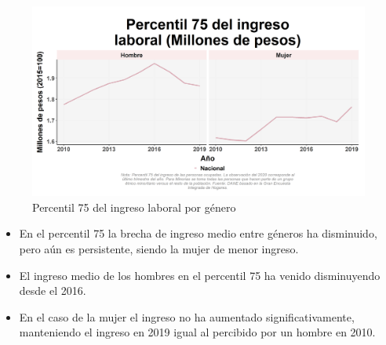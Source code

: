     \begin{figure}[H]
        \caption{Percentil 75 del ingreso laboral por género \label{map_result_2} }
        \begin{center}
        \includegraphics[width=\textwidth,keepaspectratio]{img/var_26_trend.png}
        \end{center}
    \end{figure}
            \begin{itemize}
                    \item En el percentil 75 la brecha de ingreso medio entre géneros ha disminuido, pero aún es persistente, siendo la mujer de menor ingreso.
                    \item El ingreso medio de los hombres en el percentil 75 ha venido disminuyendo desde el 2016.
                    \item En el caso de la mujer el ingreso no ha aumentado significativamente, manteniendo el ingreso en 2019 igual al percibido por un hombre en 2010.
                \end{itemize}


